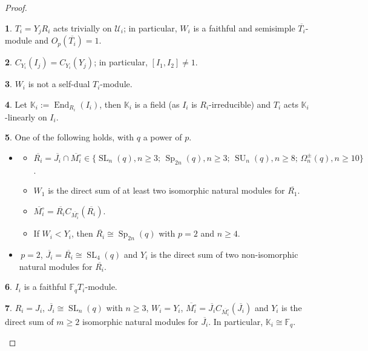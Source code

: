\documentclass{amsart}
\numberwithin{equation}{section}
\theoremstyle{definition}
\theoremstyle{subresult}
\newtheorem{subresult}{}[equation]
\theoremstyle{caseresult}
\newcommand{\bF}{\mathbb{F}}
\newcommand{\bK}{\mathbb{K}}
\newcommand{\cU}{\mathcal{U}}
\newcommand{\End}{\operatorname{End}}
\newcommand{\SL}{\operatorname{SL}}
\newcommand{\Sp}{\operatorname{Sp}}
\newcommand{\SU}{\operatorname{SU}}
\newcommand{\ov}{\overline}
\newcommand{\<}{\langle}
\renewcommand{\>}{\rangle}
\begin{document}
\begin{proof}
	\begin{subresult}\label{4.13-4}
		$T_i = Y_jR_i$ acts trivially on $\cU_i$; in particular, $W_i$ is a faithful and semisimple $\ov{T_i}$-module and $O_p(\ov{T_i}) = 1$.
	\end{subresult}

	\begin{subresult}\label{4.13-5}
		$C_{Y_i}(I_j) = C_{Y_i}(Y_j)$; in particular, $[I_1,I_2] \ne 1$.
	\end{subresult}

	\begin{subresult}\label{4.13-6}
		$W_i$ is not a self-dual $T_i$-module.
	\end{subresult}

	\begin{subresult}\label{4.13-7}
		Let $\bK_i := \End_{R_i}(I_i)$, then $\bK_i$ is a field (as $I_i$ is $R_i$-irreducible) and $T_i$ acts $\bK_i$-linearly on $I_i$.
	\end{subresult}
	
	\begin{subresult}\label{4.13-8}
		One of the following holds, with $q$ a power of $p$.
		\begin{itemize}[leftmargin=5em]
			\item[1)] \begin{itemize}
				\item[(a)] $\ov{R_i} = \ov{J_i} \cap \ov{M_i^\circ} \in \{ \SL_n(q), n \ge 3; \, \Sp_{2n}(q), n\ge 3; \, \SU_n(q), n \ge 8; \, \Omega^{\pm}_n(q), n \ge 10 \}$.
				\item[(b)] $W_1$ is the direct sum of at least two isomorphic natural modules for $\ov{R_1}$.
				\item[(c)] $\ov{M_i^\circ} = \ov{R_i} C_{\ov{M_i^\circ}}(\ov{R_i})$.
				\item[(d)] If $W_i < Y_i$, then $\ov{R_i} \cong \Sp_{2n}(q)$ with $p=2$ and $n \ge 4$.
			\end{itemize}
			\item[2)] $\, p=2$, $\ov{J_i} = \ov{R_i} \cong \SL_4(q)$ and $Y_i$ is the direct sum of two non-isomorphic natural modules for $\ov{R_i}$.
		\end{itemize}
	\end{subresult}
	
	\begin{subresult}\label{4.13-9}
		$I_i$ is a faithful $\bF_q T_i$-module.
	\end{subresult}
	
	\begin{subresult}\label{4.13-10}
		$R_i=J_i$, $\ov{J_i} \cong \SL_n(q)$ with $n \ge 3$, $W_i = Y_i$, $\ov{M_i^\circ} = \ov{J_i}C_{\ov{M_i^\circ}}(\ov{J_i})$ and $Y_i$ is the direct sum of $m \ge 2$ isomorphic natural modules for $\ov{J_i}$. In particular, $\bK_i \cong \bF_q$.
	\end{subresult}
	

\end{proof}
\end{document}

